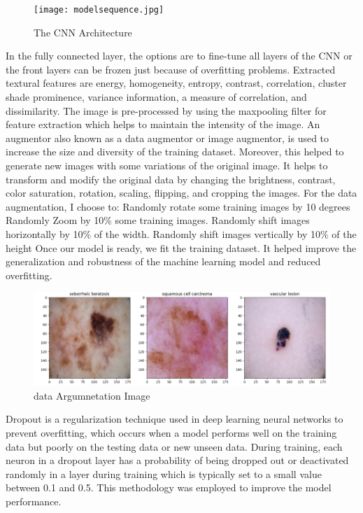 \documentclass{article}
\begin{document}
\begin{figure}
  \centering
  \texttt{[image: modelsequence.jpg]}
  \caption{The CNN Architecture}
  \label{fig:image}
\end{figure}
In the fully connected layer, the options are to fine-tune all layers of the CNN or the front layers can be frozen just because of overfitting problems.
Extracted textural features are energy, homogeneity, entropy, contrast, correlation, cluster shade
prominence, variance information, a measure of correlation, and dissimilarity. The image is pre-processed by using the maxpooling filter for feature extraction which helps to maintain the intensity of the image.
An augmentor also known as a data augmentor or image augmentor, is used to increase the size and diversity of the training dataset. Moreover, this helped to generate new images with some variations of the original image. It helps to transform and modify the original data by changing the brightness, contrast, color saturation, rotation, scaling, flipping, and cropping the images.
For the data augmentation, I choose to: Randomly rotate some training images by 10 degrees Randomly Zoom by 10\% some training images. Randomly shift images horizontally by 10\% of the width. Randomly shift images vertically by 10\% of the height Once our model is ready, we fit the training dataset. It helped improve the generalization and robustness of the machine learning model and reduced overfitting. 

\begin{figure}
  \centering
  \includegraphics[width=\textwidth]{derry.png}
  \caption{data Argumnetation Image}
  \label{fig:image}
\end{figure}

Dropout is a regularization technique used in deep learning neural networks to prevent overfitting, which occurs when a model performs well on the training data but poorly on the testing data or new unseen data.
During training, each neuron in a dropout layer has a probability of being dropped out or deactivated randomly in a layer during training which is typically set to a small value between 0.1 and 0.5.  This methodology was employed to improve the model performance.
\end{document}
